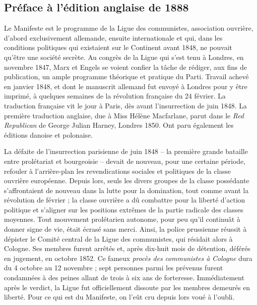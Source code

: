 \documentclass[french,twoside]{book} %
\begin{document}
\subsection[Préface à l’édition anglaise de 1888]{Préface à l’édition anglaise de 1888}
\noindent Le Manifeste est le programme de la Ligue des communistes, association ouvrière, d’abord exclusivement allemande, ensuite internationale et qui, dans les conditions politiques qui existaient sur le Continent avant 1848, ne pouvait qu’être une société secrète. Au congrès de la Ligue qui s’est tenu à Londres, en novembre 1847, Marx et Engels se voient confier la tâche de rédiger, aux fins de publication, un ample programme théorique et pratique du Parti. Travail achevé en janvier 1848, et dont le manuscrit allemand fut envoyé à Londres pour y être imprimé, à quelques semaines de la révolution française du 24 février. La traduction française vit le jour à Paris, dès avant l’insurrection de juin 1848. La première traduction anglaise, due à Miss Hélène Macfarlane, parut dans le \emph{Red Republican} de George Julian Harney, Londres 1850. Ont paru également les éditions danoise et polonaise.\par
La défaite de l’insurrection parisienne de juin 1848 – la première grande bataille entre prolétariat et bourgeoisie – devait de nouveau, pour une certaine période, refouler à l’arrière-plan les revendications sociales et politiques de la classe ouvrière européenne. Depuis lors, seuls les divers groupes de la classe possédante s’affrontaient de nouveau dans la lutte pour la domination, tout comme avant la révolution de février ; la classe ouvrière a dû combattre pour la liberté d’action politique et s’aligner sur les positions extrêmes de la partie radicale des classes moyennes. Tout mouvement prolétarien autonome, pour peu qu’il continuât à donner signe de vie, était écrasé sans merci. Ainsi, la police prussienne réussit à dépister le Comité central de la Ligue des communistes, qui résidait alors à Cologne. Ses membres furent arrêtés et, après dix-huit mois de détention, déférés en jugement, en octobre 1852. Ce fameux \emph{procès des communistes à Cologne} dura du 4 octobre au 12 novembre ; sept personnes parmi les prévenus furent condamnées à des peines allant de trois à six ans de forteresse. Immédiatement après le verdict, la Ligue fut officiellement dissoute par les membres demeurés en liberté. Pour ce qui est du Manifeste, on l’eût cru depuis lors voué à l’oubli.\par
\end{document}
